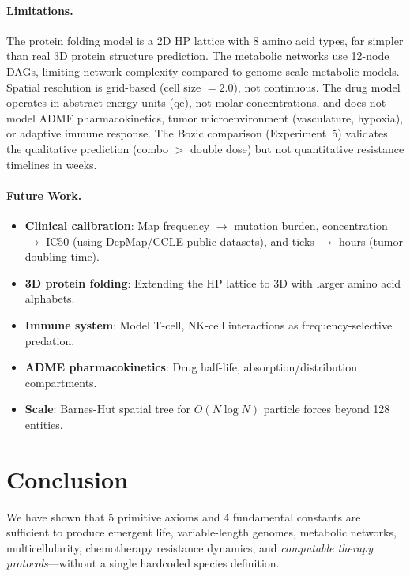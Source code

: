 \documentclass[11pt,a4paper]{article}
\begin{document}
\paragraph{Limitations.}
The protein folding model is a 2D HP lattice with 8 amino
acid types, far simpler than real 3D protein structure
prediction.
The metabolic networks use 12-node DAGs, limiting network
complexity compared to genome-scale metabolic models.
Spatial resolution is grid-based (cell size $= 2.0$),
not continuous.
The drug model operates in abstract energy units (qe), not
molar concentrations, and does not model ADME pharmacokinetics,
tumor microenvironment (vasculature, hypoxia), or adaptive
immune response.
The Bozic comparison (Experiment~5) validates the qualitative
prediction (combo $>$ double dose) but not quantitative
resistance timelines in weeks.

\paragraph{Future Work.}
\begin{itemize}
  \item \textbf{Clinical calibration}: Map frequency $\to$
        mutation burden, concentration $\to$ IC50 (using
        DepMap/CCLE public datasets), and ticks $\to$ hours
        (tumor doubling time).
  \item \textbf{3D protein folding}: Extending the HP lattice
        to 3D with larger amino acid alphabets.
  \item \textbf{Immune system}: Model T-cell, NK-cell
        interactions as frequency-selective predation.
  \item \textbf{ADME pharmacokinetics}: Drug half-life,
        absorption/distribution compartments.
  \item \textbf{Scale}: Barnes-Hut spatial tree for
        $O(N \log N)$ particle forces beyond 128 entities.
\end{itemize}

\section{Conclusion}
\label{sec:conclusion}

We have shown that 5 primitive axioms and 4 fundamental
constants are sufficient to produce emergent life,
variable-length genomes, metabolic networks,
multicellularity, chemotherapy resistance dynamics,
and \emph{computable therapy protocols}---without a
single hardcoded species definition.
\end{document}
